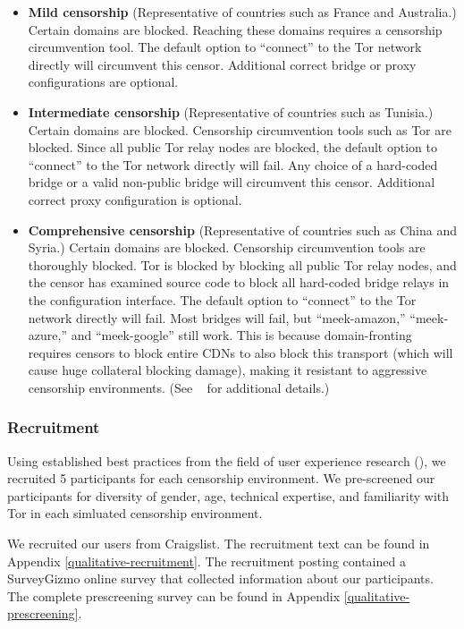 \documentclass{template}
\begin{document}
\begin{itemize} \itemsep1pt \parskip0pt 
\item {\bfseries Mild censorship} 
(Representative of countries such as France and Australia.)
Certain domains are blocked. Reaching these 
domains requires a censorship circumvention 
tool. The default option to ``connect'' to the Tor network 
directly will circumvent this censor. Additional correct
bridge or proxy configurations are optional. 

\item {\bfseries Intermediate censorship} 
(Representative of countries such as Tunisia.)
Certain domains are blocked. Censorship circumvention
tools such as Tor are blocked. Since all public Tor
relay nodes are blocked, the default option to ``connect'' to the Tor network
directly will fail. Any choice of a hard-coded bridge
or a valid non-public bridge will circumvent this censor.  
Additional correct proxy configuration is optional.

\item {\bfseries Comprehensive censorship} 
(Representative of countries such as China and Syria.)
Certain domains are blocked. Censorship circumvention tools
are thoroughly blocked. Tor is blocked by blocking all public
Tor relay nodes, and the censor has examined source code to block
all hard-coded bridge relays in the configuration interface. The default option
to ``connect'' to the Tor network directly will fail. Most bridges will fail,
but ``meek-amazon,'' ``meek-azure,'' and ``meek-google'' still work.
This is because domain-fronting requires censors to block entire CDNs to also
block this transport (which will cause huge collateral blocking damage), making
it resistant to aggressive censorship environments.
(See ~\cite{fifield2015blocking} for additional details.)\\
\end{itemize}

\subsubsection{Recruitment}
Using established best practices from the field of user experience research
(\cite{howmanyusers}), we recruited 5 participants for each censorship environment.
We pre-screened our participants for diversity of gender, age, technical expertise,
and familiarity with Tor in each simluated censorship environment. 

We recruited our users from Craigslist. The recruitment text can be found in 
Appendix \ref{qualitative-recruitment}. The recruitment posting contained a 
SurveyGizmo online survey that collected information about our participants.
The complete prescreening survey can be found in Appendix \ref{qualitative-prescreening}.  
\end{document}
